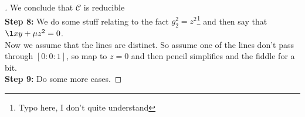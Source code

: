 \documentclass{article}
\begin{document}
\begin{proof}[]
  We conclude that $\mathcal{C}$ is reducible\\

  \textbf{Step 8:} We do some stuff relating to the fact $g_2^2 = z^2$\footnote{Typo here, I don't quite understand} and then say that $\l xy + \mu z^2 = 0$.\\
  Now we assume that the lines are distinct. So assume one of the lines don't pass through $[0 : 0 : 1]$, so map to $z = 0$ and then pencil simplifies and the fiddle for a bit.\\
  \textbf{Step 9:} Do some more cases.
\end{proof}
\end{document}
